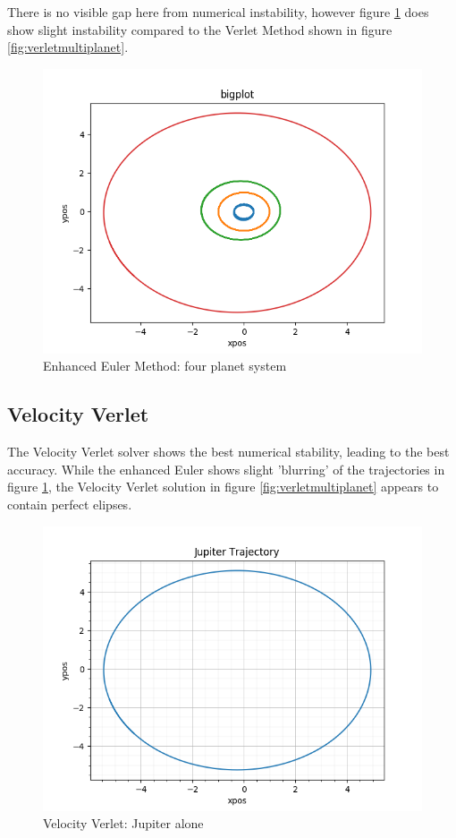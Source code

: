 \documentclass[12pt]{article} %
\begin{document}
There is no visible gap here from numerical instability, however figure \ref{fig:enhancedeulermultiplanet} does show slight instability compared to the Verlet Method shown in figure \ref{fig:verletmultiplanet}.

\begin{figure}
	\includegraphics[scale=\scaleA]{euler_enhanced_multiplanet.png}
	\centering
	\caption{Enhanced Euler Method: four planet system}
	\label{fig:enhancedeulermultiplanet}
\end{figure}

\subsection{Velocity Verlet}
The Velocity Verlet solver shows the best numerical stability, leading to the best accuracy. While the enhanced Euler shows slight 'blurring' of the trajectories in figure \ref{fig:enhancedeulermultiplanet}, the Velocity Verlet solution in figure \ref{fig:verletmultiplanet} appears to contain perfect elipses.
\begin{figure}
	\includegraphics[scale=\scaleA]{verlet_jupiter.png}
	\centering
	\caption{Velocity Verlet: Jupiter alone}
	\label{fig:verletbinary}
\end{figure}
\end{document}
